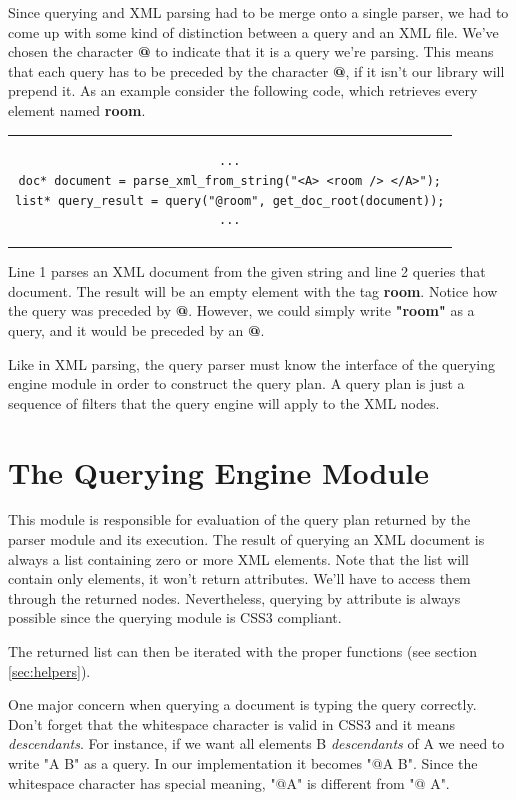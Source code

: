 \documentclass[a4paper]{report}
\begin{document}
		Since querying and XML parsing had to be merge onto a single parser, we had to come up with some kind of distinction between a query and an XML file. We've chosen the character \textbf{@} to indicate that it is a 
		query we're parsing. This means that each query has to be preceded by the character \textbf{@}, if it isn't our library will prepend it. As an example consider the following code, which retrieves every element named 
		\textbf{room}.
		
\begin{center}
	\lstset{language=C,numbers=left, captionpos=b, caption=Sample query to a DOM tree.}
		\begin{tabular}{c}
	\begin{lstlisting}		
...
doc* document = parse_xml_from_string("<A> <room /> </A>");
list* query_result = query("@room", get_doc_root(document));
...
	\end{lstlisting}		
	\end{tabular}
	\end{center}
	
		Line 1 parses an XML document from the given string and line 2 queries that document. The result will be an empty element with the tag \textbf{room}. Notice how the query was preceded by \textbf{@}. However,
		we could simply write \textbf{"room"} as a query, and it would be preceded by an \textbf{@}.
			
		Like in XML parsing, the query parser must know the interface of the querying engine module in order to construct the query plan. A query plan is just a sequence of filters that the query engine will apply to the XML
		nodes.
		
\section{The Querying Engine Module}\label{sec:sels}
	This module is responsible for evaluation of the query plan returned by the parser module and its execution. The result of querying an XML document is always a list containing zero or more XML elements. Note that the list
	will contain only elements, it won't return attributes. We'll have to access them through the returned nodes. Nevertheless, querying by attribute is always possible since the querying module is CSS3 compliant.

	The returned list can then be iterated with the proper functions (see section \ref{sec:helpers}).

	One major concern when querying a document is typing the query correctly. Don't forget that the whitespace character is valid in CSS3 and it means \emph{descendants}. For instance, if we want all elements B 
	\emph{descendants} of A we need to write "A B" as a query. In our implementation it becomes "@A B". Since the whitespace character has special meaning, "@A" is different from "@ A". 	
	
\end{document}
